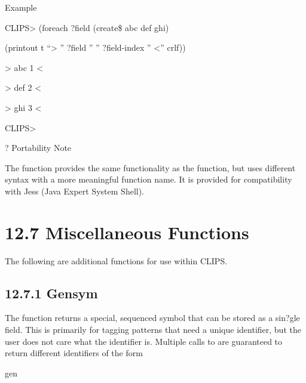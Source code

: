\documentclass[letterpaper,10pt,english]{sphinxmanual}
\begin{document}

\begin{sphinxVerbatim}[commandchars=\\\{\}]
   
\end{sphinxVerbatim}

Example

CLIPS\textgreater{} (foreach ?field (create\$ abc def ghi)

(printout t “\textendash{}\textgreater{} ” ?field ” ” ?field-index ” \textless{}\textendash{}” crlf))

\textendash{}\textgreater{} abc 1 \textless{}\textendash{}

\textendash{}\textgreater{} def 2 \textless{}\textendash{}

\textendash{}\textgreater{} ghi 3 \textless{}\textendash{}

CLIPS\textgreater{}

? Portability Note

The  function provides the same functionality as the
 function, but uses different syntax with a more meaningful
function name. It is provided for compatibility with Jess (Java Expert
System Shell).


\section{12.7 Miscellaneous Functions}
\label{\detokenize{actions:miscellaneous-functions}}
The following are additional functions for use within CLIPS.


\subsection{12.7.1 Gensym}
\label{\detokenize{actions:gensym}}
The  function returns a special, sequenced symbol that can be
stored as a sin?gle field. This is primarily for tagging patterns that
need a unique identifier, but the user does not care what the identifier
is. Multiple calls to  are guaranteed to return different
identifiers of the form

gen
\end{document}
